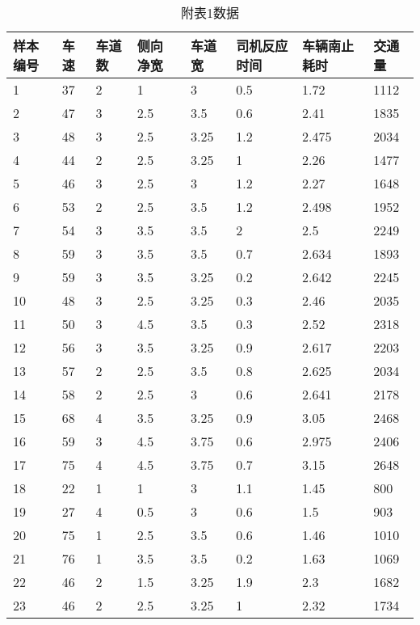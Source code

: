 
\begin{table*}[h!]
  \centering
  \small
  \caption{附表1数据}
  \begin{tabular*}{\linewidth}{p{40pt}<{\centering}p{30pt}<{\centering}
    p{30pt}<{\centering}p{40pt}<{\centering}p{50pt}<{\centering}p{70pt}<{\centering}
    p{60pt}<{\centering}p{50pt}<{\centering}}
    \toprule
    样本编号 &  车速 & 车道数  & 侧向 净宽 &  车道宽  &  司机反应时间  & 车辆南止耗时  &  交通量  \\
    \midrule
    1 & 37 {\color{Blue} } & 2 & 1 & 3 & 0.5 & 1.72 & 1112 \\
    2 & 47 & 3 & 2.5 & 3.5 & 0.6 & 2.41 & 1835 \\
    3 & 48 & 3 & 2.5 & 3.25 & 1.2 & 2.475 & 2034 \\
    4 & 44 & 2 & 2.5 & 3.25 & 1 & 2.26 & 1477 \\
    5 & 46 & 3 & 2.5 & 3 & 1.2 & 2.27 & 1648 \\
    6 & 53 & 2 & 2.5 & 3.5 & 1.2 & 2.498 & 1952 \\
    7 & 54 & 3 & 3.5 & 3.5 & 2 & 2.5 & 2249 \\
    8 & 59 & 3 & 3.5 & 3.5 & 0.7 & 2.634 & 1893 \\
    9 & 59 & 3 & 3.5 & 3.25 & 0.2 & 2.642 & 2245 \\
    10 & 48 & 3 & 2.5 & 3.25 & 0.3 & 2.46 & 2035 \\
    11 & 50 & 3 & 4.5 & 3.5 & 0.3 & 2.52 & 2318 \\
    12 & 56 & 3 & 3.5 & 3.25 & 0.9 & 2.617 & 2203 \\
    13 & 57 & 2 & 2.5 & 3.5 & 0.8 & 2.625 & 2034 \\
    14 & 58 & 2 & 2.5 & 3 & 0.6 & 2.641 & 2178 \\
    15 & 68 & 4 & 3.5 & 3.25 & 0.9 & 3.05 & 2468 \\
    16 & 59 & 3 & 4.5 & 3.75 & 0.6 & 2.975 & 2406 \\
    17 & 75 & 4 & 4.5 & 3.75 & 0.7 & 3.15 & 2648 \\
    18 & 22 & 1 & 1 & 3 & 1.1 & 1.45 & 800 \\
    19 & 27 & 4 & 0.5 & 3 & 0.6 & 1.5 & 903 \\
    20 & 75 & 1 & 2.5 & 3.5 & 0.6 & 1.46 & 1010 \\
    21 & 76 & 1 & 3.5 & 3.5 & 0.2 & 1.63 & 1069 \\
    22 & 46 & 2 & 1.5 & 3.25 & 1.9 & 2.3 & 1682 \\
    23 & 46 & 2 & 2.5 & 3.25 & 1 & 2.32 & 1734 \\

\end{tabular*}
\end{table*}
